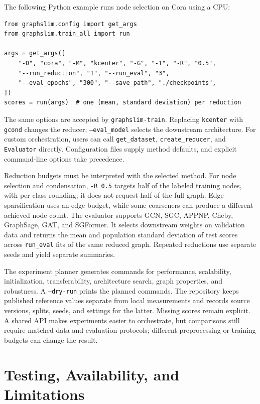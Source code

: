 \documentclass[twoside,11pt]{article}
\begin{document}
The following Python example runs node selection on Cora using a CPU:
\begin{verbatim}
from graphslim.config import get_args
from graphslim.train_all import run

args = get_args([
    "-D", "cora", "-M", "kcenter", "-G", "-1", "-R", "0.5",
    "--run_reduction", "1", "--run_eval", "3",
    "--eval_epochs", "300", "--save_path", "./checkpoints",
])
scores = run(args)  # one (mean, standard deviation) per reduction
\end{verbatim}
The same options are accepted by \texttt{graphslim-train}. Replacing
\texttt{kcenter} with \texttt{gcond} changes the reducer; \texttt{--eval\_model}
selects the downstream architecture. For custom orchestration, users can call
\texttt{get\_dataset}, \texttt{create\_reducer}, and \texttt{Evaluator} directly.
Configuration files supply method defaults, and explicit command-line options
take precedence.

Reduction budgets must be interpreted with the selected method. For node
selection and condensation, \texttt{-R 0.5} targets half of the labeled training
nodes, with per-class rounding; it does not request half of the full graph.
Edge sparsification uses an edge budget, while some coarseners can produce a
different achieved node count. The evaluator supports GCN, SGC, APPNP, Cheby,
GraphSage, GAT, and SGFormer. It selects downstream weights on validation data
and returns the mean and population standard deviation of test scores across
\texttt{run\_eval} fits of the same reduced graph. Repeated reductions use
separate seeds and yield separate summaries.

The experiment planner generates commands for performance,
scalability, initialization, transferability, architecture search, graph
properties, and robustness. A \texttt{--dry-run} prints the planned commands.
The repository keeps published reference values separate from local measurements
and records source versions, splits, seeds, and settings for the latter.
Missing scores remain explicit. A shared API makes experiments easier to
orchestrate, but comparisons still require matched data and evaluation
protocols; different preprocessing or training budgets can change the result.

\section{Testing, Availability, and Limitations}
\end{document}

